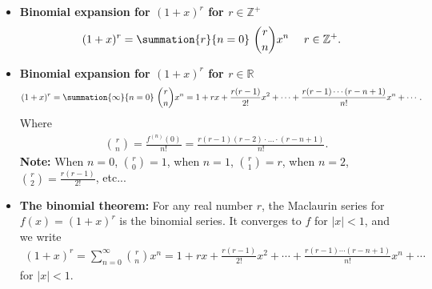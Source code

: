 \documentclass{report}
\begin{document}
\begin{itemize}
            \item \textbf{Binomial expansion for $(1+x)^{r}$ for $r\in\mathbb{Z^{+}}$}
                \begin{align*}
                    (1+x)^{r}= \summation{r}{n=0}\ \binom{r}{n}x^{n}\ \quad r \in \mathbb{Z^{+}}
                .\end{align*}
            \item \textbf{Binomial expansion for $(1+x)^{r}$ for $r\in\mathbb{R}$}
                \begin{align*}
                    (1+x)^{r} = \summation{\infty}{n=0}\ \binom{r}{n}x^{n} = 1+rx+ \frac{r(r-1)}{2!}x^2 + \cdots + \frac{r(r-1)\cdots(r-n+1)}{n!}x^n + \cdots
                .\end{align*}
                Where 
                \begin{align*}
            &\binom{r}{n} = \frac{f^{(n)}(0)}{n!} = \frac{r(r-1)(r-2)\cdot ...\cdot (r-n+1)}{n!} 
        .\end{align*}
        \textbf{Note:} When $n=0$, $\binom{r}{0} = 1$, when $n=1$, $\binom{r}{1} = r$, when $n=2$, $\binom{r}{2} = \frac{r(r-1)}{2!} $, etc...
    \item \textbf{The binomial theorem:}
        For any real number \(r\), the Maclaurin series for \( f(x) = (1 + x)^r \) is the binomial series. It converges to \(f\) for \(|x| < 1\), and we write
        \begin{align*}
            (1 + x)^r = \sum_{n=0}^{\infty} \binom{r}{n} x^n = 1 + rx + \frac{r(r-1)}{2!}x^2 + \cdots + \frac{r(r-1) \cdots (r-n+1)}{n!}x^n + \cdots
        \end{align*}
        for \(|x| < 1\).
\end{itemize}


\pagebreak \bigbreak \noindent 
\end{document}

